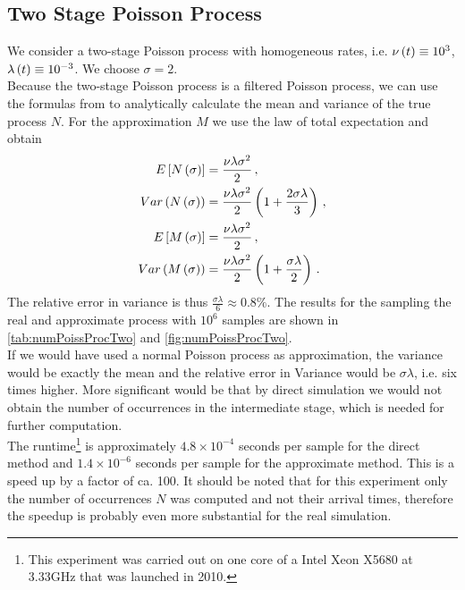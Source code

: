 \documentclass{amsart}
\numberwithin{equation}{section}
\begin{document}
\subsection{Two Stage Poisson Process}\label{sec:numPoissProcTwo}
We consider a two-stage Poisson process with homogeneous rates, i.e. $\nu\left(t\right) \equiv 10^3$, $\lambda\left(t\right) \equiv 10^{-3}$. We choose $\sigma = 2$.\\

\noindent Because the two-stage Poisson process is a filtered Poisson process, we can use the formulas from \cite[chapter 4, eqn. (5.43)--(5.45)]{parzen1962stochastic} to analytically calculate the mean and variance of the true process $N$. For the approximation $M$ we use the law of total expectation and obtain
\begin{align}\label{eqn:numPoissProcTwoEVar}
\begin{split}
E\left[N\left(\sigma\right)\right] &= \frac{\nu \lambda \sigma^2}{2} \,, \\
Var\left(N\left(\sigma\right)\right) &= \frac{\nu \lambda \sigma^2}{2} \left(1 + \frac{2 \sigma \lambda}{3}\right) \,, \\
E\left[M\left(\sigma\right)\right] &= \frac{\nu \lambda \sigma^2}{2} \,,\\
Var\left(M\left(\sigma\right)\right) &= \frac{\nu \lambda \sigma^2}{2} \left(1 + \frac{\sigma \lambda}{2}\right) \, .
\end{split}
\end{align}
The relative error in variance is thus $\frac{\sigma \lambda}{6} \approx 0.8 \%$. The results for the sampling the real and approximate process with $10^6$ samples are shown in \autoref{tab:numPoissProcTwo} and \autoref{fig:numPoissProcTwo}.\\

\noindent If we would have used a normal Poisson process as approximation, the variance would be exactly the mean and the relative error in Variance would be $\sigma \lambda$, i.e. six times higher. More significant would be that by direct simulation we would not obtain the number of occurrences in the intermediate stage, which is needed for further computation.\\

\noindent The runtime\footnote{This experiment was carried out on one core of a Intel Xeon X5680 at 3.33GHz that was launched in 2010.} is approximately $4.8 \times 10^{-4}$ seconds per sample for the direct method and $1.4 \times 10^{-6}$ seconds per sample for the approximate method. This is a speed up by a factor of ca. 100. It should be noted that for this experiment only the number of occurrences $N$ was computed and not their arrival times, therefore the speedup is probably even more substantial for the real simulation.\\
\end{document}
